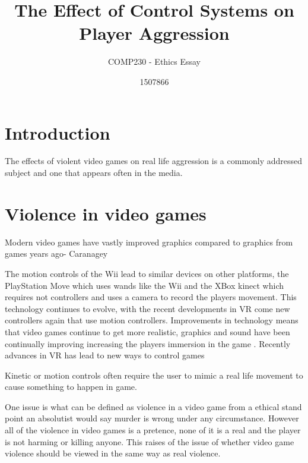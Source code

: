 \documentclass{scrartcl}
\title{The Effect of Control Systems on Player Aggression }
\subtitle{COMP230 - Ethics Essay}
\author{1507866}
\begin{document}
	
\maketitle
	
	
\section{Introduction}
The effects of violent video games on real life aggression is a commonly addressed subject and one that appears often in the media.

\section{Violence in video games}
 
Modern video games have vastly improved graphics compared to graphics from games years ago- Caranagey 


The motion controls of the Wii lead to similar devices on other platforms, the PlayStation Move which uses wands 
like the Wii and the XBox kinect which requires not controllers and uses a camera to record the players movement.
This technology continues to evolve, with the recent developments in VR come new controllers again that use motion controllers. 
Improvements in technology means that video games continue to get more realistic, graphics and sound have been continually improving increasing the players immersion in the game \cite{Kim}. Recently advances in VR has lead to new ways to control games 

Kinetic or motion controls often require the user to mimic a real life movement to cause something to happen in game. 

One issue is what can be defined as violence in a video game from a ethical stand point an absolutist would say murder is wrong under any circumstance. \cite{forsyth1980taxonomy} However all of the violence in video games is a pretence, none of it is a real and the player is not harming or killing anyone. \cite{Tavinor} This raises of the issue of whether video game violence should be viewed in the same way as real violence. 
\end{document}
